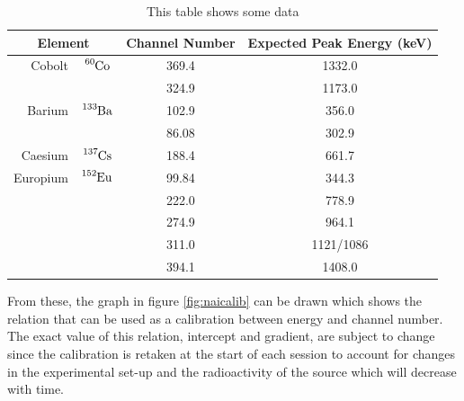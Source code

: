 \begin{table}[ht]
	\centering
	\begin{tabular}{r c|c|c}
		\multicolumn{2}{c|}{Element} & Channel Number & Expected Peak Energy (keV) \\
		\hline\hline
		Cobolt 		& $\ce{^{60}Co}$  & 369.4	& 1332.0 \\
					&				  & 324.9	& 1173.0	\\
		\hline
		Barium		& $\ce{^{133}Ba}$ & 102.9	& 356.0	\\
					&				  & 86.08	& 302.9		\\
		\hline
		Caesium		& $\ce{^{137}Cs}$ & 188.4	& 661.7 \\
		\hline
		Europium	& $\ce{^{152}Eu}$ & 99.84	& 344.3 \\
					&				  & 222.0	& 778.9		\\
					&				  & 274.9	& 964.1		\\
					&				  & 311.0	& 1121/1086	\\
					&				  & 394.1	& 1408.0	
	\end{tabular}
	\caption{This table shows some data\label{tab:myfirsttable}}
\end{table}
From these, the graph in figure \ref{fig:naicalib} can be drawn which shows the relation that can be used as a calibration between energy and channel number. The exact value of this relation, intercept and gradient, are subject to change since the calibration is retaken at the start of each session to account for changes in the experimental set-up and the radioactivity of the source which will decrease with time.

